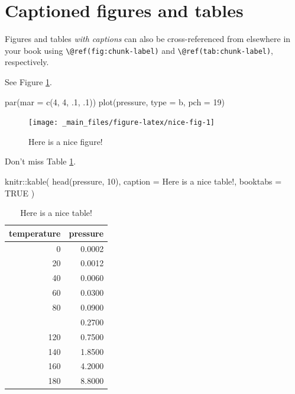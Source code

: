 \documentclass[
]{book}
\newenvironment{Shaded}{\begin{snugshade}}{\end{snugshade}}
\newcommand{\AttributeTok}[1]{\textcolor[rgb]{0.77,0.63,0.00}{#1}}
\newcommand{\ConstantTok}[1]{\textcolor[rgb]{0.00,0.00,0.00}{#1}}
\newcommand{\DecValTok}[1]{\textcolor[rgb]{0.00,0.00,0.81}{#1}}
\newcommand{\FunctionTok}[1]{\textcolor[rgb]{0.00,0.00,0.00}{#1}}
\newcommand{\NormalTok}[1]{#1}
\newcommand{\SpecialCharTok}[1]{\textcolor[rgb]{0.00,0.00,0.00}{#1}}
\newcommand{\StringTok}[1]{\textcolor[rgb]{0.31,0.60,0.02}{#1}}
\theoremstyle{definition}
\theoremstyle{definition}
\theoremstyle{definition}
\theoremstyle{definition}
\theoremstyle{remark}
\begin{document}
\hypertarget{captioned-figures-and-tables}{%
\section{Captioned figures and tables}\label{captioned-figures-and-tables}}

Figures and tables \emph{with captions} can also be cross-referenced from elsewhere in your book using \texttt{\textbackslash{}@ref(fig:chunk-label)} and \texttt{\textbackslash{}@ref(tab:chunk-label)}, respectively.

See Figure \ref{fig:nice-fig}.

\begin{Shaded}
\begin{Highlighting}[]
\FunctionTok{par}\NormalTok{(}\AttributeTok{mar =} \FunctionTok{c}\NormalTok{(}\DecValTok{4}\NormalTok{, }\DecValTok{4}\NormalTok{, .}\DecValTok{1}\NormalTok{, .}\DecValTok{1}\NormalTok{))}
\FunctionTok{plot}\NormalTok{(pressure, }\AttributeTok{type =} \StringTok{\textquotesingle{}b\textquotesingle{}}\NormalTok{, }\AttributeTok{pch =} \DecValTok{19}\NormalTok{)}
\end{Highlighting}
\end{Shaded}

\begin{figure}

{\centering \texttt{[image: \_main\_files/figure-latex/nice-fig-1]} 

}

\caption{Here is a nice figure!}\label{fig:nice-fig}
\end{figure}

Don't miss Table \ref{tab:nice-tab}.

\begin{Shaded}
\begin{Highlighting}[]
\NormalTok{knitr}\SpecialCharTok{::}\FunctionTok{kable}\NormalTok{(}
  \FunctionTok{head}\NormalTok{(pressure, }\DecValTok{10}\NormalTok{), }\AttributeTok{caption =} \StringTok{\textquotesingle{}Here is a nice table!\textquotesingle{}}\NormalTok{,}
  \AttributeTok{booktabs =} \ConstantTok{TRUE}
\NormalTok{)}
\end{Highlighting}
\end{Shaded}

\begin{table}

\caption{\label{tab:nice-tab}Here is a nice table!}
\centering
\begin{tabular}[t]{rr}
\toprule
temperature & pressure\\
\midrule
0 & 0.0002\\
20 & 0.0012\\
40 & 0.0060\\
60 & 0.0300\\
80 & 0.0900\\
\addlinespace
100 & 0.2700\\
120 & 0.7500\\
140 & 1.8500\\
160 & 4.2000\\
180 & 8.8000\\
\bottomrule
\end{tabular}
\end{table}
\end{document}
